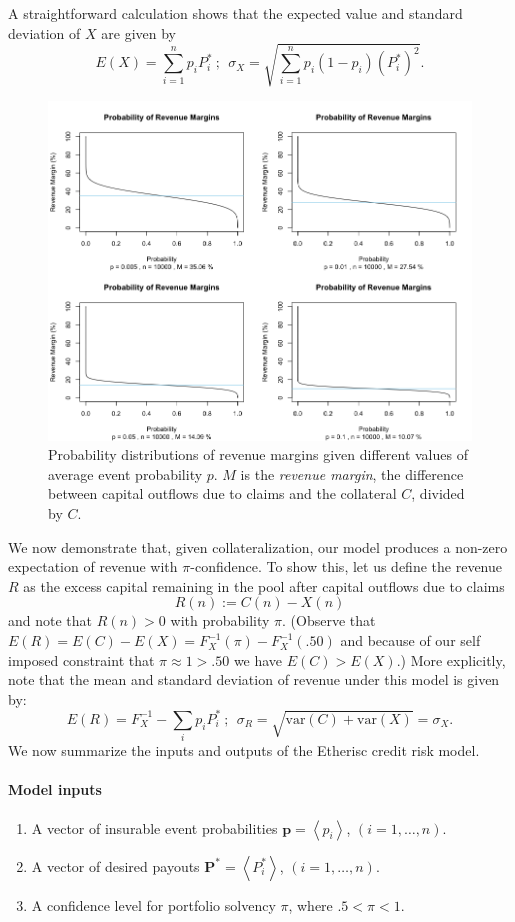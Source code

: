 \documentclass[12pt,a4paper]{article}
\begin{document}
A straightforward calculation shows that the expected value and standard deviation of $X$ are given by
  $$E(X) = \sum_{i=1}^np_iP_i^*\ ;\ \ \sigma_X = \sqrt{\sum_{i=1}^np_i(1-p_i)(P_i^*)^2}.$$
\begin{figure}[H]
    \begin{center}
        \includegraphics[scale=.5]{margins}
    \end{center}
    \caption{\footnotesize Probability distributions of revenue margins given different values of average event probability $p$. $M$ is the \textit{revenue margin}, the difference between capital outflows due to claims and the collateral $C$, divided by $C$.}\label{fig1}
\end{figure}
We now demonstrate that, given collateralization, our model produces a non-zero expectation of revenue with $\pi$-confidence. To show this, let us define the revenue $R$ as the excess capital remaining in the pool after capital outflows due to claims
    $$R(n) := C(n) - X(n)$$ 
and note that $R(n)>0$ with probability $\pi$. (Observe that $E(R)=E(C)-E(X)=F_X^{-1}(\pi)-F_X^{-1}(.50)$ and because of our self imposed constraint that $\pi \approx 1 >.50$ we have $E(C)>E(X)$.) More explicitly, note that the mean and standard deviation of revenue under this model is given by:
$$E(R) = F_X^{-1} - \sum_i p_i P_i^*\ ;\ \ \sigma_R = \sqrt{\text{var}(C) + \text{var}(X)} = \sigma_X.$$
We now summarize the inputs and outputs of the Etherisc credit risk model.

\paragraph{Model inputs}
\begin{enumerate}
    \item A vector of insurable event probabilities $\mathbf{p}=\left<p_i\right>$, $(i=1,\ldots,n)$.
    \item A vector of desired payouts $\mathbf{P^*} = \left<P_i^*\right>$, $(i=1,\ldots,n)$.
    \item A confidence level for portfolio solvency $\pi$, where $.5 < \pi < 1$.
\end{enumerate}
\end{document}
